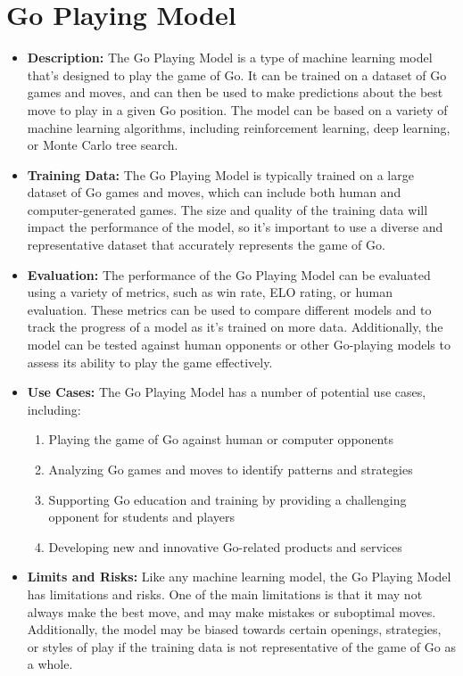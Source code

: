 \section{Go Playing Model}

\begin{itemize}
    \item \textbf{Description:} The Go Playing Model is a type of machine learning model that's designed to play the game of Go. It can be trained on a dataset of Go games and moves, and can then be used to make predictions about the best move to play in a given Go position. The model can be based on a variety of machine learning algorithms, including reinforcement learning, deep learning, or Monte Carlo tree search.
    \item \textbf{Training Data:} The Go Playing Model is typically trained on a large dataset of Go games and moves, which can include both human and computer-generated games. The size and quality of the training data will impact the performance of the model, so it's important to use a diverse and representative dataset that accurately represents the game of Go.
    \item \textbf{Evaluation:} The performance of the Go Playing Model can be evaluated using a variety of metrics, such as win rate, ELO rating, or human evaluation. These metrics can be used to compare different models and to track the progress of a model as it's trained on more data. Additionally, the model can be tested against human opponents or other Go-playing models to assess its ability to play the game effectively.
    \item \textbf{Use Cases:} The Go Playing Model has a number of potential use cases, including:
        \begin{enumerate}  
            \item Playing the game of Go against human or computer opponents
            \item Analyzing Go games and moves to identify patterns and strategies
            \item Supporting Go education and training by providing a challenging opponent for students and players
            \item Developing new and innovative Go-related products and services
        \end{enumerate}
    \item \textbf{Limits and Risks:} Like any machine learning model, the Go Playing Model has limitations and risks. One of the main limitations is that it may not always make the best move, and may make mistakes or suboptimal moves. Additionally, the model may be biased towards certain openings, strategies, or styles of play if the training data is not representative of the game of Go as a whole.

\end{itemize}
